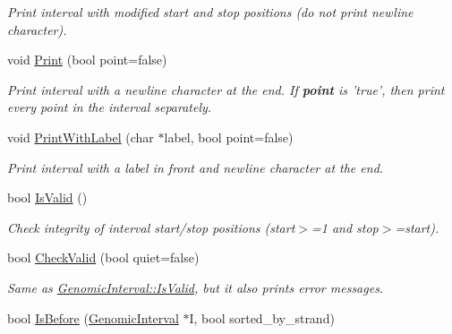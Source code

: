 \begin{CompactItemize}
\begin{CompactList}\small\item\em Print interval with modified start and stop positions (do not print newline character). \item\end{CompactList}\item 
\hypertarget{classGenomicInterval_70f300009a0cc29b024853fb794d0e9a}{
void \hyperlink{classGenomicInterval_70f300009a0cc29b024853fb794d0e9a}{Print} (bool point=false)}
\label{classGenomicInterval_70f300009a0cc29b024853fb794d0e9a}

\begin{CompactList}\small\item\em Print interval with a newline character at the end. If {\bf point} is 'true', then print every point in the interval separately. \item\end{CompactList}\item 
\hypertarget{classGenomicInterval_dbd1571cf6db0ef646f9b1e095bfcb4e}{
void \hyperlink{classGenomicInterval_dbd1571cf6db0ef646f9b1e095bfcb4e}{PrintWithLabel} (char $\ast$label, bool point=false)}
\label{classGenomicInterval_dbd1571cf6db0ef646f9b1e095bfcb4e}

\begin{CompactList}\small\item\em Print interval with a label in front and newline character at the end. \item\end{CompactList}\item 
\hypertarget{classGenomicInterval_79d1e06f62b4c1eddda7b9fc62733c7b}{
bool \hyperlink{classGenomicInterval_79d1e06f62b4c1eddda7b9fc62733c7b}{IsValid} ()}
\label{classGenomicInterval_79d1e06f62b4c1eddda7b9fc62733c7b}

\begin{CompactList}\small\item\em Check integrity of interval start/stop positions (start$>$=1 and stop$>$=start). \item\end{CompactList}\item 
\hypertarget{classGenomicInterval_b9323c2818c13a25fda953ae18fc97aa}{
bool \hyperlink{classGenomicInterval_b9323c2818c13a25fda953ae18fc97aa}{CheckValid} (bool quiet=false)}
\label{classGenomicInterval_b9323c2818c13a25fda953ae18fc97aa}

\begin{CompactList}\small\item\em Same as \hyperlink{classGenomicInterval_79d1e06f62b4c1eddda7b9fc62733c7b}{GenomicInterval::IsValid}, but it also prints error messages. \item\end{CompactList}\item 
\hypertarget{classGenomicInterval_36dc2d4059337cc03a1211b6b8a7471c}{
bool \hyperlink{classGenomicInterval_36dc2d4059337cc03a1211b6b8a7471c}{IsBefore} (\hyperlink{classGenomicInterval}{GenomicInterval} $\ast$I, bool sorted\_\-by\_\-strand)}
\label{classGenomicInterval_36dc2d4059337cc03a1211b6b8a7471c}


\end{CompactItemize}
